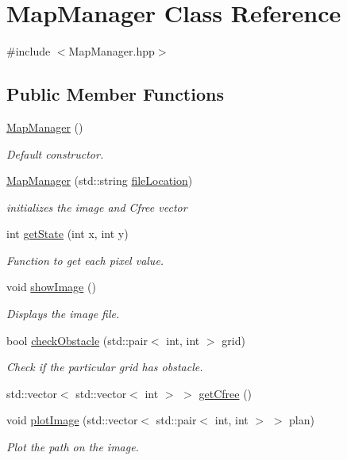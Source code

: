 \hypertarget{classMapManager}{}\section{Map\+Manager Class Reference}
\label{classMapManager}


{\ttfamily \#include $<$Map\+Manager.\+hpp$>$}

\subsection*{Public Member Functions}
\begin{DoxyCompactItemize}
\item 
\hyperlink{classMapManager_a4a81e7c7db9ae561694db39f12d3807f}{Map\+Manager} ()
\begin{DoxyCompactList}\small\item\em Default constructor. \end{DoxyCompactList}\item 
\hyperlink{classMapManager_a36d8e276e6104d5675b40dff1918189f}{Map\+Manager} (std\+::string \hyperlink{test_8cpp_a73740b243e97be1a2520548c12cc10b6}{file\+Location})
\begin{DoxyCompactList}\small\item\em initializes the image and Cfree vector \end{DoxyCompactList}\item 
int \hyperlink{classMapManager_a22aa7d0ed38a31bfe68a5b8374adeea8}{get\+State} (int x, int y)
\begin{DoxyCompactList}\small\item\em Function to get each pixel value. \end{DoxyCompactList}\item 
void \hyperlink{classMapManager_a90da7d5967e39d207a3f03e8a2d39616}{show\+Image} ()
\begin{DoxyCompactList}\small\item\em Displays the image file. \end{DoxyCompactList}\item 
bool \hyperlink{classMapManager_a1057b862a4d78c41b50307b64b273b1d}{check\+Obstacle} (std\+::pair$<$ int, int $>$ grid)
\begin{DoxyCompactList}\small\item\em Check if the particular grid has obstacle. \end{DoxyCompactList}\item 
std\+::vector$<$ std\+::vector$<$ int $>$ $>$ \hyperlink{classMapManager_ae89530a83904f7b37d4a1670be734d04}{get\+Cfree} ()
\item 
void \hyperlink{classMapManager_ac4c0f8e23d794f8cb6ae317021ffcae4}{plot\+Image} (std\+::vector$<$ std\+::pair$<$ int, int $>$ $>$ plan)
\begin{DoxyCompactList}\small\item\em Plot the path on the image. \end{DoxyCompactList}\end{DoxyCompactItemize}


